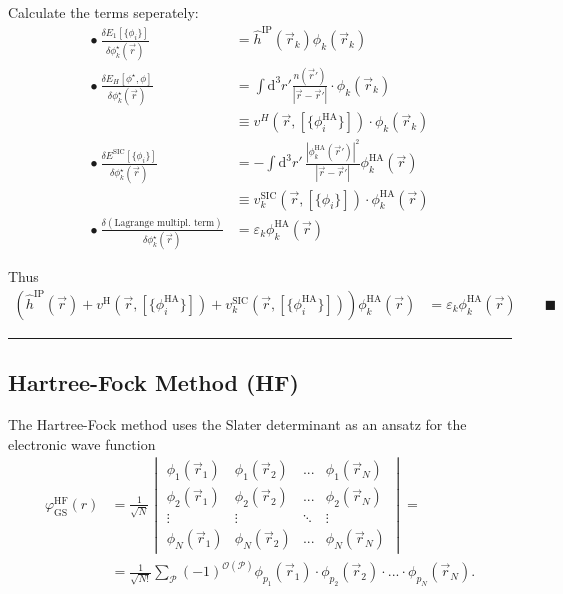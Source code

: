 \documentclass{article}
\newcommand{\diff}{\mathrm{d}}
\newcommand{\lr}[1]{\left(#1\right)}
\begin{document}
{	Calculate the terms seperately:
		\begin{align*}
			\bullet \ \frac{ \delta E_1[\{\phi_i\}] }{ \delta \phi_k^\star(\vec{r}) } &= \hat{h}^\text{IP}(\vec{r}_k) \phi_k(\vec{r}_k)\\
			\bullet \ \frac{\delta E_H[\phi^\star, \phi]}{\delta \phi_k^\star(\vec{r})} &= \int \diff^3r' \frac{n(\vec{r}')}{|\vec{r} - \vec{r}'|} \cdot \phi_k(\vec{r}_k) \\
			&\equiv v^H(\vec{r}, [\{\phi_i^\text{HA}\}]) \cdot \phi_k(\vec{r}_k) \\
			\bullet \ \frac{\delta E^\text{SIC}[\{\phi_i\}]}{\delta \phi_k^\star(\vec{r})} &= - \int \diff^3r' \, \frac{|\phi_k^\text{HA}(\vec{r}')|^2}{|\vec{r} - \vec{r}'|} \phi_k^\text{HA}(\vec{r}) \\
			&\equiv v_k^\text{SIC}(\vec{r}, [\{\phi_i\}]) \cdot \phi_k^\text{HA}(\vec{r}) \\
			\bullet \ \frac{\delta \lr{ \text{Lagrange multipl. term} }}{\delta \phi_k^\star(\vec{r})} &= \varepsilon_k \phi_k^\text{HA}(\vec{r})
		\end{align*}
	
	Thus
		\begin{align*}
			\lr{ \hat{h}^\text{IP}(\vec{r}) + v^\text{H}(\vec{r},[\{\phi_i^\text{HA}\}]) + v_k^\text{SIC}(\vec{r}, [\{\phi_i^\text{HA}\}]) } \phi_k^\text{HA}(\vec{r}) &= \varepsilon_k \phi_k^\text{HA}(\vec{r}) \qquad \blacksquare
		\end{align*}
\hrule
}


\newpage


\subsection{Hartree-Fock Method (HF)}
The Hartree-Fock method uses the Slater determinant as an ansatz for the electronic wave function
	\begin{align}
		\varphi_\text{GS}^\text{HF}(r) &= \frac{1}{\sqrt{N}}
		\begin{vmatrix}
			\phi_1(\vec{r}_1) & \phi_1(\vec{r}_2) & ... & \phi_1(\vec{r}_N) \\
			\phi_2(\vec{r}_1) & \phi_2(\vec{r}_2) & ... & \phi_2(\vec{r}_N) \\		
			\vdots & \vdots & \ddots & \vdots \\
			\phi_N(\vec{r}_1) & \phi_N(\vec{r}_2) & ... & \phi_N(\vec{r}_N)
		\end{vmatrix}
		= \\
		&= \frac{1}{\sqrt{N!}} \sum_\mathcal{P} (-1)^{\mathcal{O}(\mathcal{P})} \phi_{p_1}(\vec{r}_1) \cdot \phi_{p_2}(\vec{r}_2) \cdot ... \cdot \phi_{p_N}(\vec{r}_N).
	\end{align}
\end{document}
